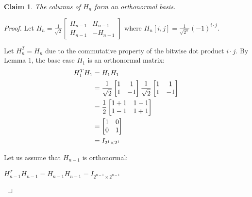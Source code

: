 \documentclass[11pt]{article}
\theoremstyle{definition}
\theoremstyle{plain}
\newtheorem{claim}{Claim}
\theoremstyle{indented-remark}
\theoremstyle{indented-proof}
\begin{document}
\begin{claim}
The columns of $H_{n}$ form an orthonormal basis.
\end{claim}

\begin{proof}
Let $H_{n} = \frac{1}{\sqrt{2}}
\begin{bmatrix} 
H_{n-1} & H_{n-1} \\
H_{n-1} & -H_{n-1} 
\end{bmatrix}$ where $H_{n}[i,j] = \frac{1}{\sqrt{2^{n}}}(-1)^{i \cdot j}$. \newline 

\noindent Let $H^{T}_{n} = H_{n}$ due to the commutative property of the bitwise dot product $i \cdot j$. By Lemma 1, the base case $H_{1}$ is an orthonormal matrix:
\begin{align}
H_{1}^{T}H_{1} &= H_{1}H_{1} \notag \\
&= \frac{1}{\sqrt{2}}
\begin{bmatrix} 
1 & 1 \\
1 & -1 
\end{bmatrix}
\frac{1}{\sqrt{2}}
\begin{bmatrix} 
1 & 1 \\
1 & -1 
\end{bmatrix} \notag \\
&= \frac{1}{2}
\begin{bmatrix} 
1+1 & 1-1 \\
1-1 & 1+1 
\end{bmatrix}\notag \\
&= 
\begin{bmatrix} 
1 & 0 \\
0 & 1 
\end{bmatrix}\notag \\
&=
I_{2^{1} \times 2^{1}} \notag
\end{align}

\noindent Let us assume that $H_{n-1}$ is orthonormal: 
\begin{center}
$H_{n-1}^{T}H_{n-1} = H_{n-1}H_{n-1} = I_{2^{n-1} \times 2^{n-1}}$
\end{center}


\end{proof}
\end{document}
